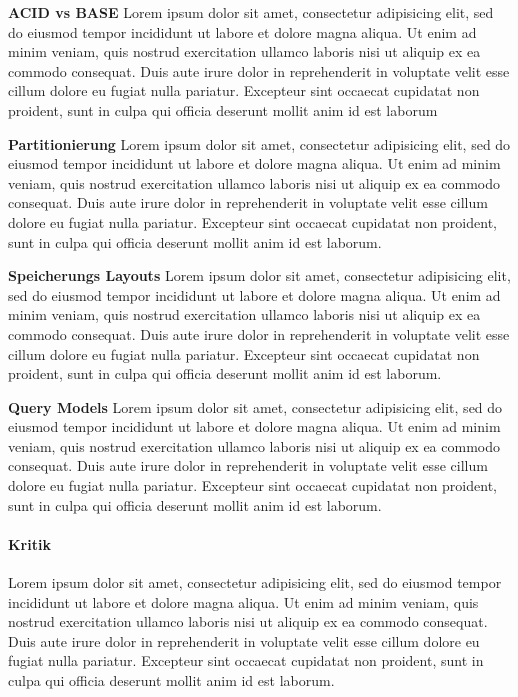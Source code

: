 \tab\textbf{ACID vs BASE}
Lorem ipsum dolor sit amet, consectetur adipisicing elit, sed do eiusmod
tempor incididunt ut labore et dolore magna aliqua. Ut enim ad minim veniam,
quis nostrud exercitation ullamco laboris nisi ut aliquip ex ea commodo
consequat. Duis aute irure dolor in reprehenderit in voluptate velit esse
cillum dolore eu fugiat nulla pariatur. Excepteur sint occaecat cupidatat non
proident, sunt in culpa qui officia deserunt mollit anim id est laborum

\tab\textbf{Partitionierung}
Lorem ipsum dolor sit amet, consectetur adipisicing elit, sed do eiusmod
tempor incididunt ut labore et dolore magna aliqua. Ut enim ad minim veniam,
quis nostrud exercitation ullamco laboris nisi ut aliquip ex ea commodo
consequat. Duis aute irure dolor in reprehenderit in voluptate velit esse
cillum dolore eu fugiat nulla pariatur. Excepteur sint occaecat cupidatat non
proident, sunt in culpa qui officia deserunt mollit anim id est laborum.

\tab\textbf{Speicherungs Layouts}
Lorem ipsum dolor sit amet, consectetur adipisicing elit, sed do eiusmod
tempor incididunt ut labore et dolore magna aliqua. Ut enim ad minim veniam,
quis nostrud exercitation ullamco laboris nisi ut aliquip ex ea commodo
consequat. Duis aute irure dolor in reprehenderit in voluptate velit esse
cillum dolore eu fugiat nulla pariatur. Excepteur sint occaecat cupidatat non
proident, sunt in culpa qui officia deserunt mollit anim id est laborum.

\tab\textbf{Query Models}
Lorem ipsum dolor sit amet, consectetur adipisicing elit, sed do eiusmod
tempor incididunt ut labore et dolore magna aliqua. Ut enim ad minim veniam,
quis nostrud exercitation ullamco laboris nisi ut aliquip ex ea commodo
consequat. Duis aute irure dolor in reprehenderit in voluptate velit esse
cillum dolore eu fugiat nulla pariatur. Excepteur sint occaecat cupidatat non
proident, sunt in culpa qui officia deserunt mollit anim id est laborum.

\paragraph{Kritik}
Lorem ipsum dolor sit amet, consectetur adipisicing elit, sed do eiusmod
tempor incididunt ut labore et dolore magna aliqua. Ut enim ad minim veniam,
quis nostrud exercitation ullamco laboris nisi ut aliquip ex ea commodo
consequat. Duis aute irure dolor in reprehenderit in voluptate velit esse
cillum dolore eu fugiat nulla pariatur. Excepteur sint occaecat cupidatat non
proident, sunt in culpa qui officia deserunt mollit anim id est laborum. \nextline


